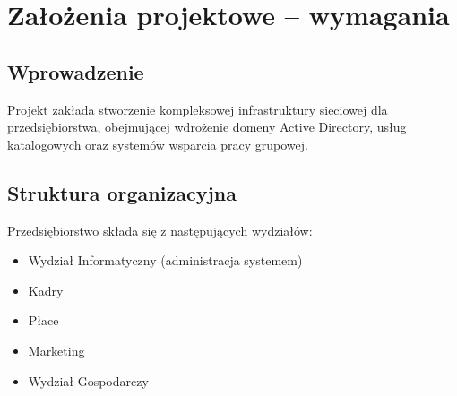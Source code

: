 \newpage
\section{Założenia projektowe – wymagania}		%

\subsection{Wprowadzenie}
Projekt zakłada stworzenie kompleksowej infrastruktury sieciowej dla przedsiębiorstwa, obejmującej wdrożenie domeny Active Directory, usług katalogowych oraz systemów wsparcia pracy grupowej.

\subsection{Struktura organizacyjna}
Przedsiębiorstwo składa się z następujących wydziałów:
\begin{itemize}
    \item Wydział Informatyczny (administracja systemem)
    \item Kadry
    \item Płace
    \item Marketing
    \item Wydział Gospodarczy
\end{itemize}


